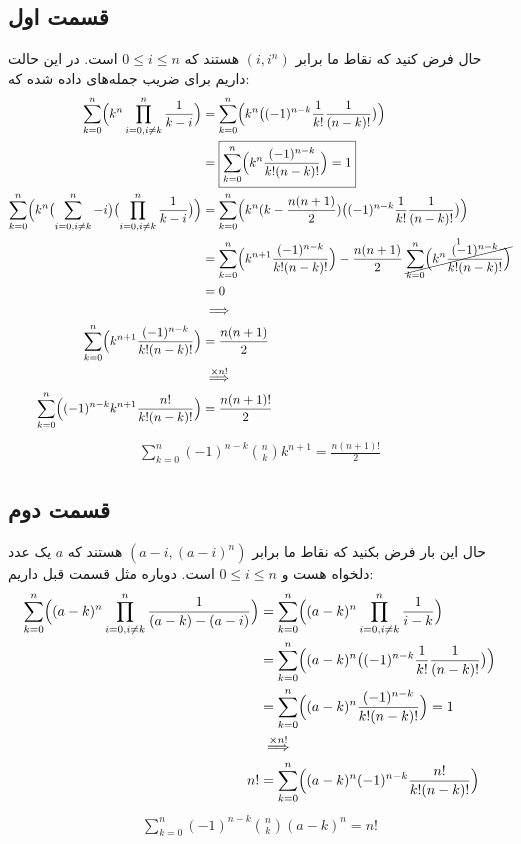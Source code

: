 \documentclass[]{article}
\begin{document}
\subsection*{قسمت اول}
حال فرض کنید که نقاط ما برابر
$(i, i^n)$
هستند که
$0 \le i \le n$
است. در این حالت داریم برای ضریب جمله‌های داده شده که:
\begin{align*}
    \sum_{k=0}^{n} \Bigl( k^n \prod_{i=0, i \neq k}^{n} \frac{1}{k - i} \Bigr)
    &= \sum_{k=0}^{n} \Bigl( k^n \bigl((-1)^{n-k} \frac{1}{k!} \frac{1}{(n - k)!} \bigr) \Bigr)\\
    &= \boxed{\sum_{k=0}^{n} \Bigl(k^n \frac{(-1)^{n-k}}{k!(n - k)!}\Bigr) = 1}\\
    \sum_{k=0}^{n} \Bigl(k^n \bigl( \sum_{i=0, i \neq k}^{n} -i  \bigr) \bigl(\prod_{i=0, i \neq k}^{n} \frac{1}{k - i} \bigr) \Bigr)
    &= \sum_{k=0}^{n} \Bigl(k^n (k - \frac{n(n+1)}{2}) \bigl((-1)^{n-k} \frac{1}{k!} \frac{1}{(n - k)!} \bigr) \Bigr)\\
    &= \sum_{k=0}^{n} \Bigl(k^{n+1} \frac{(-1)^{n-k}}{k!(n - k)!} \Bigr) - \frac{n(n+1)}{2} \stackrel{1}{\cancel{\sum_{k=0}^{n} \Bigl(k^n \frac{(-1)^{n-k}}{k!(n - k)!}\Bigr)}}\\
    &= 0\\
    &\implies\\
    \sum_{k=0}^{n} \Bigl(k^{n+1} \frac{(-1)^{n-k}}{k!(n - k)!} \Bigr) &= \frac{n(n+1)}{2}\\
    &\stackrel{\times n!}{\implies}\\
    \sum_{k=0}^{n} \Bigl((-1)^{n-k} k^{n+1} \frac{n!}{k!(n - k)!} \Bigr) &= \frac{n(n+1)!}{2}
\end{align*}
\begin{gather*}
    \boxed{\sum_{k=0}^{n} (-1)^{n-k} {n \choose k} k^{n+1} = \frac{n(n+1)!}{2}}
\end{gather*}
\subsection*{قسمت دوم}
حال این بار فرض بکنید که نقاط ما برابر
$(a - i,(a - i)^n)$
هستند که
$a$
یک عدد دلخواه هست و
$0 \le i \le n$
است. دوباره مثل قسمت قبل داریم:
\begin{align*}
    \sum_{k=0}^{n} \Bigl( (a-k)^n \prod_{i=0, i \neq k}^{n} \frac{1}{(a-k) - (a-i)} \Bigr)
    &= \sum_{k=0}^{n} \Bigl( (a-k)^n \prod_{i=0, i \neq k}^{n} \frac{1}{i - k} \Bigr)\\
    &= \sum_{k=0}^{n} \Bigl( (a-k)^n \bigl((-1)^{n-k} \frac{1}{k!} \frac{1}{(n - k)!} \bigr) \Bigr)\\
    &= \sum_{k=0}^{n} \Bigl((a-k)^n \frac{(-1)^{n-k}}{k!(n - k)!}\Bigr) = 1\\
    &\stackrel{\times n!}{\implies}\\
    n! &= \sum_{k=0}^{n} \Bigl((a-k)^n (-1)^{n-k} \frac{n!}{k!(n - k)!}\Bigr)
\end{align*}
\begin{gather*}
    \boxed{\sum_{k=0}^{n} (-1)^{n-k} {n \choose k} (a-k)^n = n!}
\end{gather*}
\end{document}
